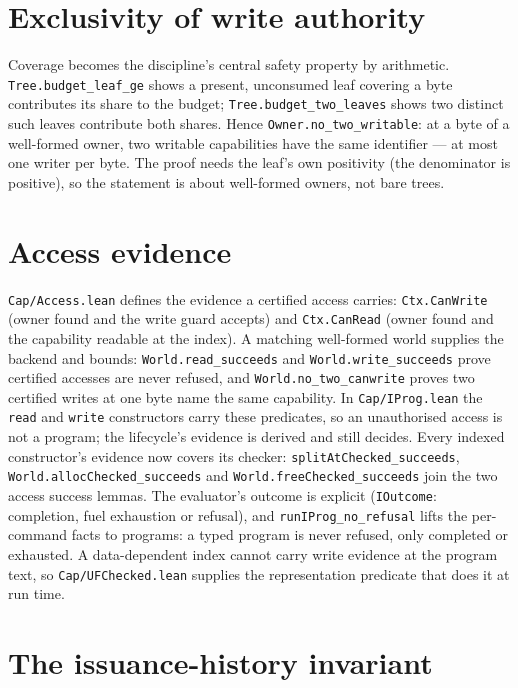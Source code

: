 \documentclass[10pt,a4paper]{article}
\newcommand{\file}[1]{\texttt{\small #1}}
\begin{document}
\section{Exclusivity of write authority}

Coverage becomes the discipline's central safety property by arithmetic.
\texttt{Tree.budget\_leaf\_ge} shows a present, unconsumed leaf covering a byte
contributes its share to the budget; \texttt{Tree.budget\_two\_leaves} shows two
distinct such leaves contribute both shares. Hence
\texttt{Owner.no\_two\_writable}: at a byte of a well-formed owner, two
writable capabilities have the same identifier --- at most one writer per byte.
The proof needs the leaf's own positivity (the denominator is positive), so the
statement is about well-formed owners, not bare trees.

\section{Access evidence}

\file{Cap/Access.lean} defines the evidence a certified access carries:
\texttt{Ctx.CanWrite} (owner found and the write guard accepts) and
\texttt{Ctx.CanRead} (owner found and the capability readable at the index).
A matching well-formed world supplies the backend and bounds:
\texttt{World.read\_succeeds} and \texttt{World.write\_succeeds} prove
certified accesses are never refused, and \texttt{World.no\_two\_canwrite}
proves two certified writes at one byte name the same capability. In
\file{Cap/IProg.lean} the \texttt{read} and \texttt{write} constructors carry
these predicates, so an unauthorised access is not a program; the lifecycle's
evidence is derived and still decides. Every indexed constructor's evidence now covers its checker:
\texttt{splitAtChecked\_succeeds}, \texttt{World.allocChecked\_succeeds} and
\texttt{World.freeChecked\_succeeds} join the two access success lemmas. The
evaluator's outcome is explicit (\texttt{IOutcome}: completion, fuel exhaustion
or refusal), and \texttt{runIProg\_no\_refusal} lifts the per-command facts to
programs: a typed program is never refused, only completed or exhausted. A
data-dependent index cannot carry write evidence at the program text, so
\file{Cap/UFChecked.lean} supplies the representation predicate that does it at
run time.

\section{The issuance-history invariant}
\end{document}
